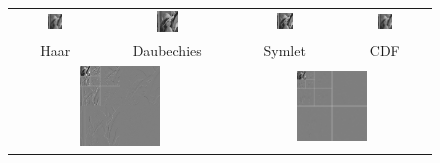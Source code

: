 \documentclass[11pt,a4paper]{article}
\begin{document}
\begin{figure}[!htbp]
	\centering
	\begin{tabular}{cccc} 
		\includegraphics[width=0.18\textwidth]{pro7/dwt/haar_res}&
		\includegraphics[width=0.18\textwidth]{pro7/dwt/db_res}&
		\includegraphics[width=0.18\textwidth]{pro7/dwt/sym_res}&
		\includegraphics[width=0.18\textwidth]{pro7/dwt/cdf_res}\\
		 Haar & Daubechies & Symlet &CDF\\
		\multicolumn{2}{c}{
			\includegraphics[width=0.38\textwidth]{pro7/dwt/haar_dwt}
		}&
		\multicolumn{2}{c}{
			\includegraphics[width=0.38\textwidth]{pro7/dwt/db_dwt}
}
\end{tabular}
\end{figure}
\end{document}
